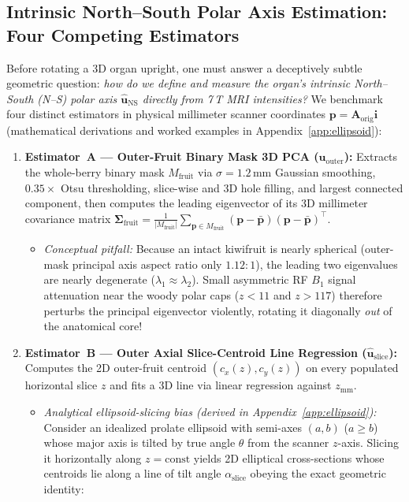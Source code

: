 \documentclass[10pt,a4paper]{article}
\renewcommand{\_}{\origunderscore\allowbreak}
\begin{document}
\subsection{Intrinsic North--South Polar Axis Estimation: Four Competing Estimators}
\label{sec:meth_axis}

Before rotating a 3D organ upright, one must answer a deceptively subtle geometric question: \emph{how do we define and measure the organ's intrinsic North--South (N--S) polar axis $\hat{\mathbf{u}}_{\text{NS}}$ directly from 7\,T MRI intensities?} We benchmark four distinct estimators in physical millimeter scanner coordinates $\mathbf{p} = \mathbf{A}_{\text{orig}}\mathbf{i}$ (mathematical derivations and worked examples in Appendix~\ref{app:ellipsoid}):

\begin{enumerate}
    \item \textbf{Estimator~A --- Outer-Fruit Binary Mask 3D PCA ($\hat{\mathbf{u}}_{\text{outer}}$):} Extracts the whole-berry binary mask $M_{\text{fruit}}$ via $\sigma=1.2\,\text{mm}$ Gaussian smoothing, $0.35\times$ Otsu thresholding, slice-wise and 3D hole filling, and largest connected component, then computes the leading eigenvector of its 3D millimeter covariance matrix $\boldsymbol{\Sigma}_{\text{fruit}} = \frac{1}{|M_{\text{fruit}}|}\sum_{\mathbf{p}\in M_{\text{fruit}}}(\mathbf{p}-\bar{\mathbf{p}})(\mathbf{p}-\bar{\mathbf{p}})^\top$.
    \begin{itemize}
        \item \emph{Conceptual pitfall:} Because an intact kiwifruit is nearly spherical (outer-mask principal axis aspect ratio only $1.12:1$), the leading two eigenvalues are nearly degenerate ($\lambda_1 \approx \lambda_2$). Small asymmetric RF $B_1$ signal attenuation near the woody polar caps ($z<11$ and $z>117$) therefore perturbs the principal eigenvector violently, rotating it diagonally \emph{out} of the anatomical core!
    \end{itemize}
    \item \textbf{Estimator~B --- Outer Axial Slice-Centroid Line Regression ($\hat{\mathbf{u}}_{\text{slice}}$):} Computes the 2D outer-fruit centroid $(c_x(z), c_y(z))$ on every populated horizontal slice $z$ and fits a 3D line via linear regression against $z_{\text{mm}}$.
    \begin{itemize}
        \item \emph{Analytical ellipsoid-slicing bias (derived in Appendix~\ref{app:ellipsoid}):} Consider an idealized prolate ellipsoid with semi-axes $(a, b)$ ($a \ge b$) whose major axis is tilted by true angle $\theta$ from the scanner $z$-axis. Slicing it horizontally along $z = \text{const}$ yields 2D elliptical cross-sections whose centroids lie along a line of tilt angle $\alpha_{\text{slice}}$ obeying the exact geometric identity:

\end{itemize}
\end{enumerate}
\end{document}
